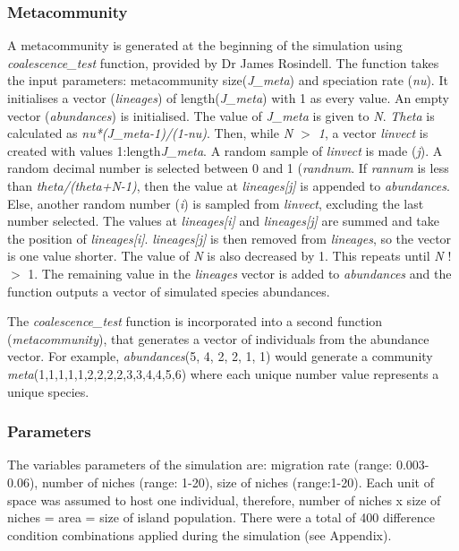 \documentclass{article}
\begin{document}
\subsubsection{Metacommunity}
A metacommunity is generated at the beginning of the simulation using \textit{coalescence\_test} function, provided by Dr James Rosindell. The function takes the input parameters: metacommunity size(\textit{J\_meta}) and speciation rate (\textit{nu}). It initialises a vector (\textit{lineages}) of length(\textit{J\_meta}) with 1 as every value. An empty vector (\textit{abundances}) is initialised. The value of \textit{J\_meta} is given to \textit{N}. \textit{Theta} is calculated as \textit{nu*(J\_meta-1)/(1-nu)}. Then, while \textit{N $>$ 1}, a vector \textit{linvect} is created with values 1:length\textit{J\_meta}. A random sample of \textit{linvect} is made (\textit{j}). A random decimal number is selected between 0 and 1 (\textit{randnum}. If \textit{rannum} is less than \textit{theta/(theta+N-1)}, then the value at \textit{lineages[j]} is appended to \textit{abundances}. Else, another random number (\textit{i}) is sampled from \textit{linvect}, excluding the last number selected. The values at \textit{lineages[i]} and \textit{lineages[j]} are summed and take the position of \textit{lineages[i]}. \textit{lineages[j]} is then removed from \textit{lineages}, so the vector is one value shorter. The value of \textit{N} is also decreased by 1. This repeats until \textit{N} !$>$ 1. The remaining value in the \textit{lineages} vector is added to \textit{abundances} and the function outputs a vector of simulated species abundances.\bigskip

\noindent The \textit{coalescence\_test} function is incorporated into a second function (\textit{metacommunity}), that generates a vector of individuals from the abundance vector. For example, \textit{abundances}(5, 4, 2, 2, 1, 1) would generate a community \textit{meta}(1,1,1,1,1,2,2,2,2,3,3,4,4,5,6) where each unique number value represents a unique species.\bigskip     

\subsubsection{Parameters}
The variables parameters of the simulation are: migration rate (range: 0.003-0.06), number of niches (range: 1-20), size of niches (range:1-20). Each unit of space was assumed to host one individual, therefore, number of niches x size of niches = area = size of island population. There were a total of 400 difference condition combinations applied during the simulation (see Appendix). 
\end{document}
